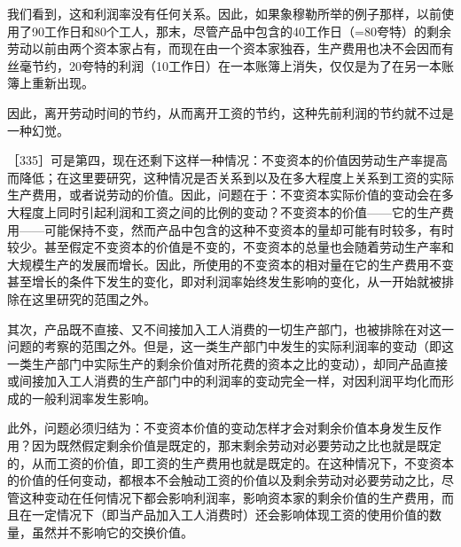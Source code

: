 我们看到，这和利润率没有任何关系。因此，如果象穆勒所举的例子那样，以前使用了90工作日和80个工人，那末，尽管产品中包含的40工作日（=80夸特）的剩余劳动以前由两个资本家占有，而现在由一个资本家独吞，生产费用也决不会因而有丝毫节约，20夸特的利润（10工作日）在一本账簿上消失，仅仅是为了在另一本账簿上重新出现。

因此，离开劳动时间的节约，从而离开工资的节约，这种先前利润的节约就不过是一种幻觉。


［335］可是第四，现在还剩下这样一种情况：不变资本的价值因劳动生产率提高而降低；在这里要研究，这种情况是否关系到以及在多大程度上关系到工资的实际生产费用，或者说劳动的价值。因此，问题在于：不变资本实际价值的变动会在多大程度上同时引起利润和工资之间的比例的变动？不变资本的价值——它的生产费用——可能保持不变，然而产品中包含的这种不变资本的量却可能有时较多，有时较少。甚至假定不变资本的价值是不变的，不变资本的总量也会随着劳动生产率和大规模生产的发展而增长。因此，所使用的不变资本的相对量在它的生产费用不变甚至增长的条件下发生的变化，即对利润率始终发生影响的变化，从一开始就被排除在这里研究的范围之外。

其次，产品既不直接、又不间接加入工人消费的一切生产部门，也被排除在对这一问题的考察的范围之外。但是，这一类生产部门中发生的实际利润率的变动（即这一类生产部门中实际生产的剩余价值对所花费的资本之比的变动），却同产品直接或间接加入工人消费的生产部门中的利润率的变动完全一样，对因利润平均化而形成的一般利润率发生影响。

此外，问题必须归结为：不变资本价值的变动怎样才会对剩余价值本身发生反作用？因为既然假定剩余价值是既定的，那末剩余劳动对必要劳动之比也就是既定的，从而工资的价值，即工资的生产费用也就是既定的。在这种情况下，不变资本的价值的任何变动，都根本不会触动工资的价值以及剩余劳动对必要劳动之比，尽管这种变动在任何情况下都会影响利润率，影响资本家的剩余价值的生产费用，而且在一定情况下（即当产品加入工人消费时）还会影响体现工资的使用价值的数量，虽然并不影响它的交换价值。

